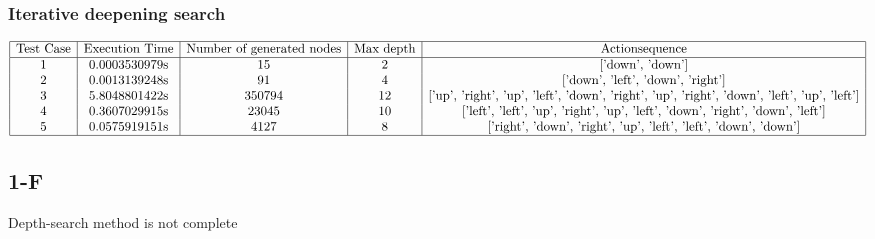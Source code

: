 \documentclass{report}
\begin{document}
                \subsubsection{Iterative deepening search}
                    $\begin{array}{|c|c|c|c|c|}
                        \hline
                        \text{Test Case} & \text{Execution Time} & \text{Number of generated nodes} & \text{Max depth} & \text {Actionsequence}\\
                        \hline
                        \text{1} & \text{0.0003530979s} & \text{15} & \text{2} & \text{['down', 'down']} \\
                        \text{2} & \text{0.0013139248s} & \text{91} & \text{4} & \text{['down', 'left', 'down', 'right']} \\
                        \text{3} & \text{5.8048801422s} & \text{350794} & \text{12} & \text{['up', 'right', 'up', 'left', 'down', 'right', 'up', 'right', 'down', 'left', 'up', 'left']} \\
                        \text{4} & \text{0.3607029915s} & \text{23045} & \text{10} & \text{['left', 'left', 'up', 'right', 'up', 'left', 'down', 'right', 'down', 'left']} \\
                        \text{5} & \text{0.0575919151s} & \text{4127} & \text{8} & \text{['right', 'down', 'right', 'up', 'left', 'left', 'down', 'down']} \\
                        \hline
                    \end{array}$


            \subsection{1-F}
                Depth-search method is not complete
\end{document}
